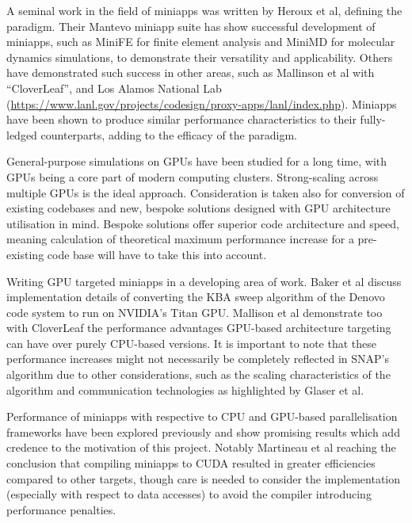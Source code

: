 \documentclass[conference]{IEEEtran}
\begin{document}
A seminal work in the field of miniapps was written by Heroux et al\cite{miniapps}, defining the paradigm. Their Mantevo miniapp suite has show successful development of miniapps, such as MiniFE for finite element analysis and MiniMD for molecular dynamics simulations, to demonstrate their versatility and applicability. Others have demonstrated such success in other areas, such as Mallinson et al with ``CloverLeaf”\cite{mallinson2013cloverleaf}, and Los Alamos National Lab (\url{https://www.lanl.gov/projects/codesign/proxy-apps/lanl/index.php}). Miniapps have been shown to produce similar performance characteristics to their fully-ledged counterparts\cite{miniapps}, adding to the efficacy of the paradigm.

General-purpose simulations on GPUs have been studied for a long time, with GPUs being a core part of modern computing clusters\cite{debardeleben2013gpu}. Strong-scaling across multiple GPUs\cite{glaser2015strong} is the ideal approach. Consideration is taken also for conversion of existing codebases\cite{zhou2011gpu} and new, bespoke solutions designed with GPU architecture utilisation in mind\cite{glaser2015strong}. Bespoke solutions offer superior code architecture and speed, meaning calculation of theoretical maximum performance increase for a pre-existing code base will have to take this into account.

Writing GPU targeted miniapps in a developing area of work. Baker et al\cite{baker2012high} discuss implementation details of converting the KBA sweep algorithm of the Denovo code system to run on NVIDIA’s Titan GPU. Mallison et al\cite{mallinson2013cloverleaf} demonstrate too with CloverLeaf the performance advantages GPU-based architecture targeting can have over purely CPU-based versions. It is important to note that these performance increases might not necessarily be completely reflected in SNAP’s algorithm due to other considerations, such as the scaling characteristics of the algorithm\cite{shoukourian2014predicting} and communication technologies as highlighted by Glaser et al\cite{glaser2015strong}.

Performance of miniapps with respective to CPU and GPU-based parallelisation frameworks have been explored previously and show promising results which add credence to the motivation of this project. Notably Martineau et al\cite{martineau2017productivity} reaching the conclusion that compiling miniapps to CUDA resulted in greater efficiencies compared to other targets, though care is needed to consider the implementation (especially with respect to data accesses) to avoid the compiler introducing performance penalties.
\end{document}
